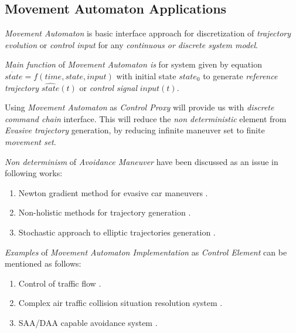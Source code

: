 \subsection{Movement Automaton Applications}\label{sec:MovementAutomatonBackground}

    \noindent\emph{Movement Automaton} is basic interface approach for discretization of \emph{trajectory evolution}  or \emph{control input} for any \emph{continuous or discrete system model}.
    
    \emph{Main function} of \emph{Movement Automaton is} for system given by equation $\dot{state}=f(time,state,input)$ with initial state $state_0$ to generate \emph{reference trajectory} $\hat{state}(t)$ or \emph{control signal} $input(t)$.
    
    Using \emph{Movement Automaton} as \emph{Control Proxy} will provide us with \emph{discrete command chain} interface. This will reduce the \emph{non deterministic} element from \emph{Evasive trajectory} generation, by reducing infinite maneuver set to finite \emph{movement set}.
    
    \emph{Non determinism} of \emph{Avoidance Maneuver} have been discussed as an issue in following works:
    \begin{enumerate}
        \item Newton gradient method for evasive car maneuvers \cite{vsantin2011combined}.
        \item Non-holistic methods for trajectory generation \cite{pin1990autonomous}.
        \item Stochastic approach to elliptic trajectories generation \cite{andrzejak2001epileptic}.
    \end{enumerate}
    
\noindent\emph{Examples} of \emph{Movement Automaton Implementation} as \emph{Control Element} can be mentioned as follows:
    \begin{enumerate}
        \item Control of traffic flow \cite{kuwata2009real}.
        \item Complex air traffic collision situation resolution system  \cite{frazzoli2001robust,frazzoli2000trajectory}.
        \item SAA/DAA capable avoidance system \cite{gomola2017obstacle}.
    \end{enumerate}


